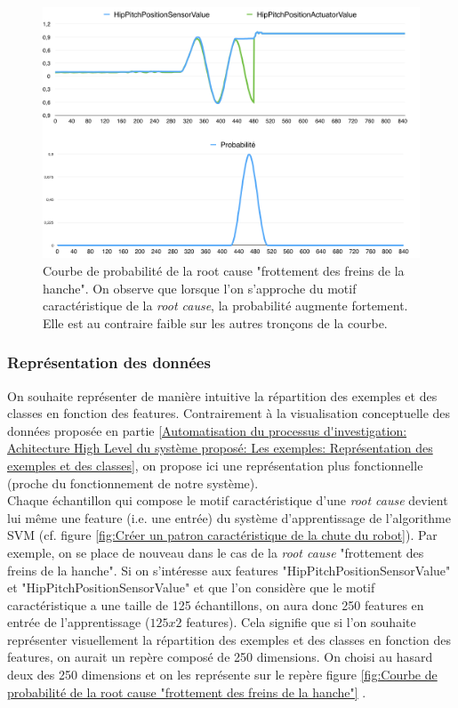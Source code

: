 \begin{figure}[h]
	\centering\includegraphics[width=12cm]{images/proba_motif.png}
	\caption[Courbe de probabilité de la root cause "frottement des freins de la hanche"]{Courbe de probabilité de la root cause "frottement des freins de la hanche".  On observe que lorsque l'on s'approche du motif caractéristique de la \emph{root cause}, la probabilité augmente fortement. Elle est au contraire faible sur les autres tronçons de la courbe.}
	\label{fig:Représentation de la répartition des exemples et des classes en fonction des features, approche fonctionnelle}
\end{figure}

\subsubsection{Représentation des données}
\label{Automatisation du processus d'investigation: Reconnaissance de motifs: Représentation des données}
On souhaite représenter de manière intuitive la répartition des exemples et des classes en fonction des features. Contrairement à la visualisation conceptuelle des données proposée en partie \ref{Automatisation du processus d'investigation: Achitecture High Level du système proposé: Les exemples: Représentation des exemples et des classes}, on propose ici une représentation plus fonctionnelle (proche du fonctionnement de notre système). \\
Chaque échantillon qui compose le motif caractéristique d'une \emph{root cause} devient lui même une feature (i.e. une entrée) du système d'apprentissage de l'algorithme SVM (cf. figure \ref{fig:Créer un patron caractéristique de la chute du robot}). Par exemple, on se place de nouveau dans le cas de la \emph{root cause} "frottement des freins de la hanche". Si on s'intéresse aux features "HipPitchPositionSensorValue" et "HipPitchPositionSensorValue" et que l'on considère que le motif caractéristique a une taille de 125 échantillons, on aura donc 250 features en entrée de l'apprentissage ($125x2$ features). Cela signifie que si l'on souhaite représenter visuellement la répartition des exemples et des classes en fonction des features, on aurait un repère composé de 250 dimensions. On choisi au hasard deux des 250 dimensions et on les représente sur le repère figure 	\ref{fig:Courbe de probabilité de la root cause "frottement des freins de la hanche"} .

